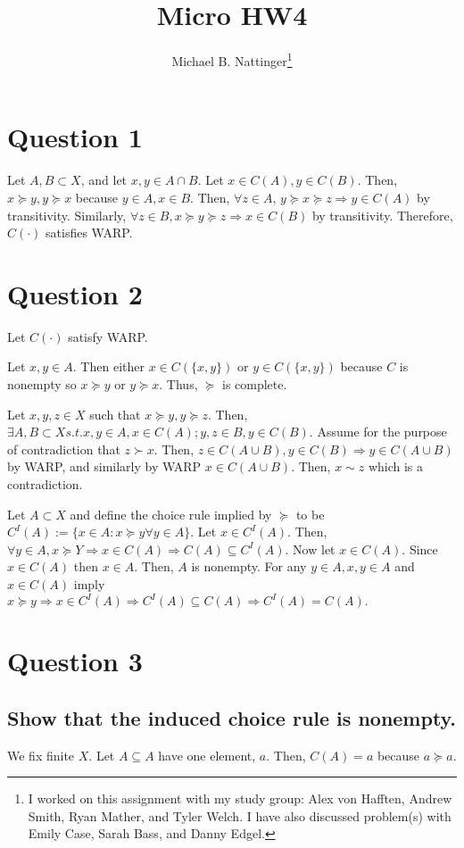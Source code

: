 \documentclass[11pt]{article} %
\title{Micro HW4}
\author{Michael B. Nattinger\footnote{I worked on this assignment with my study group: Alex von Hafften, Andrew Smith, Ryan Mather, and Tyler Welch. I have also discussed problem(s) with Emily Case, Sarah Bass, and Danny Edgel.}}
\begin{document}
\maketitle

\section{Question 1}
Let $A,B \subset X$, and let $x,y\in A\cap B.$ Let $x \in C(A),y \in C(B)$. Then, $x \succeq y,y \succeq x$ because $y\in A,x \in B$. Then, $\forall z\in A$, $y\succeq x \succeq z \Rightarrow y \in C(A)$ by transitivity. Similarly, $\forall z \in B, x\succeq y \succeq z \Rightarrow x \in C(B)$ by transitivity. Therefore, $C(\cdot)$ satisfies WARP.
  
\section{Question 2}
Let $C(\cdot)$ satisfy WARP. 

Let $x,y \in A.$ Then either $x\in C(\{ x,y\})$ or $y\in C(\{ x,y\})$ because $C$ is nonempty so $x\succeq y$ or $y \succeq x$. Thus, $\succeq$ is complete.

Let $x,y,z \in X$ such that $x\succeq y,y\succeq z.$ Then, $\exists A,B\subset X s.t. x,y\in A, x \in C(A);y,z\in B, y \in C(B).$ Assume for the purpose of contradiction that $z\succ x$. Then, $z\in C(A\cup B), y\in C(B) \Rightarrow y \in C(A \cup B)$ by WARP, and similarly by WARP $x \in C(A\cup B).$ Then, $x\sim z$ which is a contradiction.

Let $A\subset X$ and define the choice rule implied by $\succeq$ to be $C^I(A) := \{x\in A : x \succeq y \forall y \in A \}$. Let $x \in C^I(A).$ Then, $\forall y \in A, x \succeq Y \Rightarrow x \in C(A) \Rightarrow C(A)\subseteq C^I(A)$. Now let $x \in C(A).$ Since $x\in C(A)$ then $x\in A$. Then, $A$ is nonempty. For any $y \in A, x,y\in A$ and $x\in C(A)$ imply $ x\succeq y \Rightarrow x \in C^I(A) \Rightarrow C^I(A) \subseteq C(A)\Rightarrow C^I(A) = C(A).$ 
\section{Question 3}
\subsection{Show that the induced choice rule is nonempty.}
We fix finite $X$. Let $A \subseteq A$ have one element, $a$. Then, $C(A) = a$ because $a\succeq a$.
\end{document}
